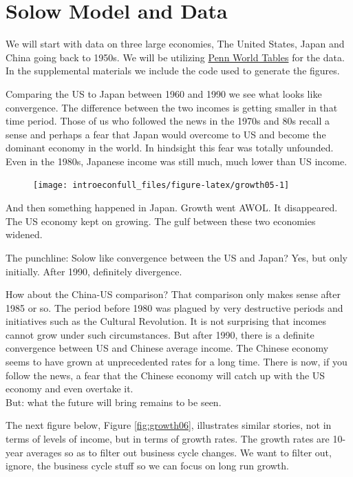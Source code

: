 \documentclass[
]{book}
\begin{document}
\hypertarget{solow-model-and-data}{%
\section{Solow Model and Data}\label{solow-model-and-data}}

We will start with data on three large economies, The United States, Japan and China going back to 1950s. We will be utilizing \href{https://www.rug.nl/ggdc/productivity/pwt/?lang=en}{Penn World Tables} for the data. In the supplemental materials we include the code used to generate the figures.

Comparing the US to Japan between 1960 and 1990 we see what looks like convergence. The difference between the two incomes is getting smaller in that time period. Those of us who followed the news in the 1970s and 80s recall a sense and perhaps a fear that Japan would overcome to US and become the dominant economy in the world. In hindsight this fear was totally unfounded. Even in the 1980s, Japanese income was still much, much lower than US income.

\begin{figure}

{\centering \texttt{[image: introeconfull\_files/figure-latex/growth05-1]} 

}

\end{figure}

And then something happened in Japan. Growth went AWOL. It disappeared. The US economy kept on growing. The gulf between these two economies widened.

The punchline: Solow like convergence between the US and Japan? Yes, but only initially. After 1990, definitely divergence.

How about the China-US comparison? That comparison only makes sense after 1985 or so. The period before 1980 was plagued by very destructive periods and initiatives such as the Cultural Revolution. It is not surprising that incomes cannot grow under such circumstances. But after 1990, there is a definite convergence between US and Chinese average income. The Chinese economy seems to have grown at unprecedented rates for a long time. There is now, if you follow the news, a fear that the Chinese economy will catch up with the US economy and even overtake it.\\
But: what the future will bring remains to be seen.

The next figure below, Figure \ref{fig:growth06}, illustrates similar stories, not in terms of levels of income, but in terms of growth rates. The growth rates are 10-year averages so as to filter out business cycle changes. We want to filter out, ignore, the business cycle stuff so we can focus on long run growth.
\end{document}
